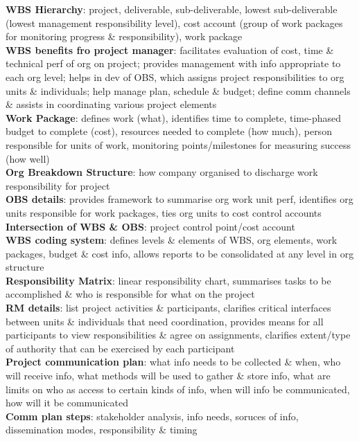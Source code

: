 \documentclass[a4paper]{article}
\begin{document}
\begin{multicols}{2}
        \textbf{WBS Hierarchy}: project, deliverable, sub-deliverable, lowest sub-deliverable (lowest management responsibility level), cost account (group of work packages for monitoring progress \& responsibility), work package\\
        \textbf{WBS benefits fro project manager}: facilitates evaluation of cost, time \& technical perf of org on project; provides management with info appropriate to each org level; helps in dev of OBS, which assigns project responsibilities to org units \& individuals; help manage plan, schedule \& budget; define comm channels \& assists in coordinating various project elements\\
        \textbf{Work Package}: defines work (what), identifies time to complete, time-phased budget to complete (cost), resources needed to complete (how much), person responsible for units of work, monitoring points/milestones for measuring success (how well)\\
        \textbf{Org Breakdown Structure}: how company organised to discharge work responsibility for project\\
        \textbf{OBS details}: provides framework to summarise org work unit perf, identifies org units responsible for work packages, ties org units to cost control accounts\\
        \textbf{Intersection of WBS \& OBS}: project control point/cost account\\
        \textbf{WBS coding system}: defines levels \& elements of WBS, org elements, work packages, budget \& cost info, allows reports to be consolidated at any level in org structure\\
        \textbf{Responsibility Matrix}: linear responsibility chart, summarises tasks to be accomplished \& who is responsible for what on the project\\
        \textbf{RM details}: list project activities \& participants, clarifies critical interfaces between units \& individuals that need coordination, provides means for all participants to view responsibilities \& agree on assignments, clarifies extent/type of authority that can be exercised by each participant\\
        \textbf{Project communication plan}: what info needs to be collected \& when, who will receive info, what methods will be used to gather \& store info, what are limits on who as access to certain kinds of info, when will info be communicated, how will it be communicated\\
        \textbf{Comm plan steps}: stakeholder analysis, info needs, soruces of info, dissemination modes, responsibility \& timing\\

\end{multicols}
\end{document}
